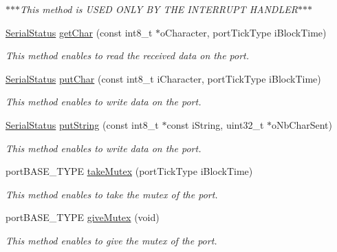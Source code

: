 \begin{DoxyCompactItemize}
\begin{DoxyCompactList}\small\item\em $\ast$$\ast$$\ast$\-This method is \-U\-S\-E\-D \-O\-N\-L\-Y \-B\-Y \-T\-H\-E \-I\-N\-T\-E\-R\-R\-U\-P\-T \-H\-A\-N\-D\-L\-E\-R$\ast$$\ast$$\ast$ \end{DoxyCompactList}\item 
\hyperlink{_serial_type_8h_a71c113451bfafdaf5fcabcd807acd480}{\-Serial\-Status} \hyperlink{class_async_serial_port1_abf7bce398cb06b5368f7a617bcbdf857}{get\-Char} (const int8\-\_\-t $\ast$o\-Character, port\-Tick\-Type i\-Block\-Time)
\begin{DoxyCompactList}\small\item\em \-This method enables to read the received data on the port. \end{DoxyCompactList}\item 
\hyperlink{_serial_type_8h_a71c113451bfafdaf5fcabcd807acd480}{\-Serial\-Status} \hyperlink{class_async_serial_port1_a414bdbd17f686e2a31f8109d4492b595}{put\-Char} (const int8\-\_\-t i\-Character, port\-Tick\-Type i\-Block\-Time)
\begin{DoxyCompactList}\small\item\em \-This method enables to write data on the port. \end{DoxyCompactList}\item 
\hyperlink{_serial_type_8h_a71c113451bfafdaf5fcabcd807acd480}{\-Serial\-Status} \hyperlink{class_async_serial_port1_a1f8e0292a566d5a16e993202a6ea9d1b}{put\-String} (const int8\-\_\-t $\ast$const i\-String, uint32\-\_\-t $\ast$o\-Nb\-Char\-Sent)
\begin{DoxyCompactList}\small\item\em \-This method enables to write data on the port. \end{DoxyCompactList}\item 
port\-B\-A\-S\-E\-\_\-\-T\-Y\-P\-E \hyperlink{class_async_serial_port1_a2be5dc99ca1c1edd5153a96f3336e6e8}{take\-Mutex} (port\-Tick\-Type i\-Block\-Time)
\begin{DoxyCompactList}\small\item\em \-This method enables to take the mutex of the port. \end{DoxyCompactList}\item 
port\-B\-A\-S\-E\-\_\-\-T\-Y\-P\-E \hyperlink{class_async_serial_port1_a38c06002c0fb8fbd5b1eb8ea4ef6a69c}{give\-Mutex} (void)
\begin{DoxyCompactList}\small\item\em \-This method enables to give the mutex of the port. \end{DoxyCompactList}\end{DoxyCompactItemize}
